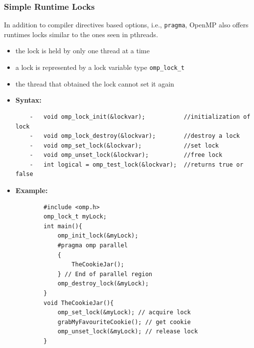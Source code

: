 \documentclass[12pt, a4paper]{report}
\begin{document}
\subsubsection{Simple Runtime Locks}
In addition to compiler directives based options, i.e., \verb$pragma$, OpenMP also offers runtimes locks similar to the ones seen in pthreads.
\begin{itemize}
    \item the lock is held by only one thread at a time
    \item a lock is represented by a lock variable type \verb$omp_lock_t$
    \item the thread that obtained the lock cannot set it again
    \item {\bfseries{Syntax:}}
    \begin{verbatim}
    -   void omp_lock_init(&lockvar);           //initialization of lock
    -   void omp_lock_destroy(&lockvar);        //destroy a lock
    -   void omp_set_lock(&lockvar);            //set lock
    -   void omp_unset_lock(&lockvar);          //free lock
    -   int logical = omp_test_lock(&lockvar);  //returns true or false
    \end{verbatim}
    \item {\bfseries{Example:}}
    \begin{verbatim}
        #include <omp.h>
        omp_lock_t myLock;
        int main(){
            omp_init_lock(&myLock);
            #pragma omp parallel
            {
                TheCookieJar();
            } // End of parallel region
            omp_destroy_lock(&myLock);
        }
        void TheCookieJar(){
            omp_set_lock(&myLock); // acquire lock
            grabMyFavouriteCookie(); // get cookie
            omp_unset_lock(&myLock); // release lock
        }
    \end{verbatim}
\end{itemize}
\end{document}
